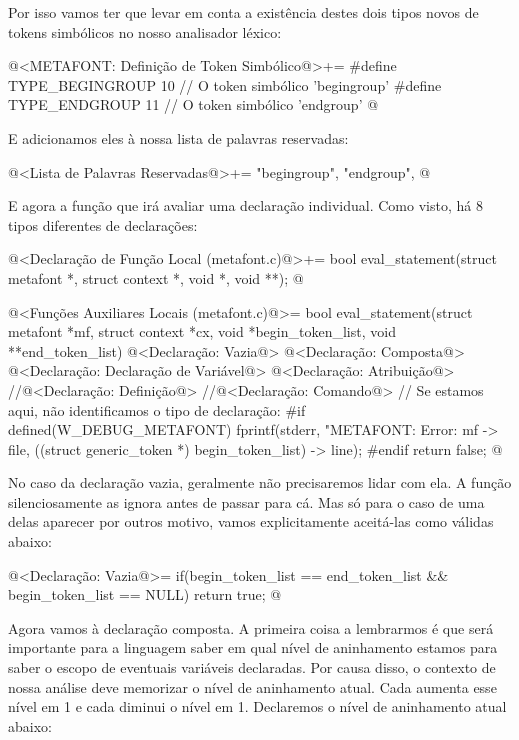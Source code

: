 Por isso vamos ter que levar em conta a existência destes dois tipos
novos de tokens simbólicos no nosso analisador léxico:

\iniciocodigo
@<METAFONT: Definição de Token Simbólico@>+=
#define TYPE_BEGINGROUP            10 // O token simbólico 'begingroup'
#define TYPE_ENDGROUP              11 // O token simbólico 'endgroup'
@
\fimcodigo

E adicionamos eles à nossa lista de palavras reservadas:

\iniciocodigo
@<Lista de Palavras Reservadas@>+=
"begingroup", "endgroup",
@
\fimcodigo

E agora a função que irá avaliar uma declaração individual. Como
visto, há 8 tipos diferentes de declarações:

\iniciocodigo
@<Declaração de Função Local (metafont.c)@>+=
bool eval_statement(struct metafont *, struct context *, void *, void **);
@
\fimcodigo

\iniciocodigo
@<Funções Auxiliares Locais (metafont.c)@>=
bool eval_statement(struct metafont *mf, struct context *cx,
                     void *begin_token_list, void **end_token_list){
  @<Declaração: Vazia@>
  @<Declaração: Composta@>
  @<Declaração: Declaração de Variável@>
  @<Declaração: Atribuição@>
  //@<Declaração: Definição@>
  //@<Declaração: Comando@>
  // Se estamos aqui, não identificamos o tipo de declaração:
#if defined(W_DEBUG_METAFONT)
    fprintf(stderr, "METAFONT: Error: %
            mf -> file,
            ((struct generic_token *) begin_token_list) -> line);
#endif
  return false;
}
@
\fimcodigo

No caso da declaração vazia, geralmente não precisaremos lidar com
ela. A função  silenciosamente
as ignora antes de passar para cá. Mas só para o caso de uma delas
aparecer por outros motivo, vamos explicitamente aceitá-las como
válidas abaixo:

\iniciocodigo
@<Declaração: Vazia@>=
if(begin_token_list == end_token_list && begin_token_list == NULL)
  return true;
@
\fimcodigo

Agora vamos à declaração composta. A primeira coisa a lembrarmos é que
será importante para a linguagem saber em qual nível de aninhamento
estamos para saber o escopo de eventuais variáveis declaradas. Por
causa disso, o contexto de nossa análise deve memorizar o nível de
aninhamento atual. Cada  aumenta esse nível em
1 e cada  diminui o nível em 1. Declaremos o
nível de aninhamento atual abaixo:


